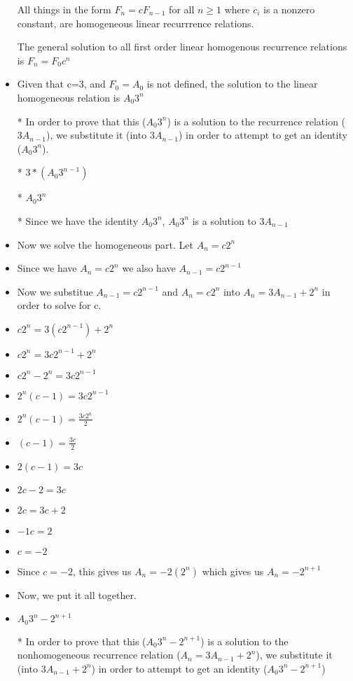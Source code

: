 \begin{enumerate}
\begin{enumerate}
\begin{itemize}
\begin{itemize}
      \item [] All things in the form $F_{n}=cF_{n-1}$ for all $n\geq1$ where $c_{i}$ is a nonzero constant, are homogeneous linear recurrrence relations.
      \item [] The general solution to all first order linear homogenous recurrence relations is $F_{n}=F_{0}c^{n}$
      \item Given that c=3, and $F_{0}=A_{0}$ is not defined, the solution to the linear homogeneous relation is $A_{0}3^{n}$
      \item [*] In order to prove that this ($A_{0}3^{n}$) is a solution to the recurrence relation ($3A_{n-1}$), we substitute it (into $3A_{n-1}$) in order to attempt to get an identity ($A_{0}3^{n}$).
      \item [*] $3*(A_{0}3^{n-1})$
      \item [*] $A_{0}3^{n}$
      \item [*] Since we have the identity $A_{0}3^{n}$, $A_{0}3^{n}$ is a solution to $3A_{n-1}$
      \item Now we solve the homogeneous part. Let $A_{n}=c2^{n}$ 
      \item Since we have $A_{n}=c2^{n}$ we also have $A_{n-1}=c2^{n-1}$
      \item Now we substitue $A_{n-1}=c2^{n-1}$ and $A_{n}=c2^{n}$ into $A_{n}=3A_{n-1}+2^{n}$ in order to solve for c.
      \item $c2^{n}=3(c2^{n-1})+2^{n}$
      \item $c2^{n}=3c2^{n-1}+2^{n}$
      \item $c2^{n}-2^{n}=3c2^{n-1}$
      \item $2^{n}(c-1)=3c2^{n-1}$
      \item $2^{n}(c-1)=\frac{3c2^{n}}{2}$
      \item $(c-1)=\frac{3c}{2}$
      \item $2(c-1)=3c$
      \item $2c-2=3c$
      \item $2c=3c+2$
      \item $-1c=2$
      \item $c=-2$
      \item Since $c=-2$, this gives us $A_{n}=-2(2^{n})$ which gives us $A_{n}=-2^{n+1}$
      \item Now, we put it all together.
      \item $A_{0}3^{n}-2^{n+1}$
      \item [*] In order to prove that this ($A_{0}3^{n}-2^{n+1}$) is a solution to the nonhomogeneous recurrence relation ($A_{n}=3A_{n-1}+2^{n}$), we substitute it (into $3A_{n-1}+2^{n}$) in order to attempt to get an identity ($A_{0}3^{n}-2^{n+1}$)

\end{itemize}
\end{itemize}
\end{enumerate}
\end{enumerate}
